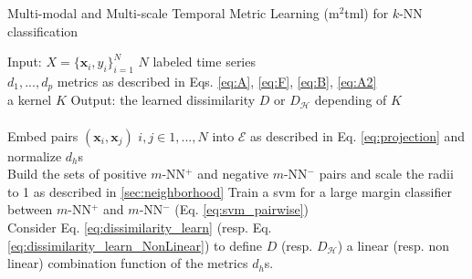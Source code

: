 \begin{algorithm}[h!]
	\begin{algorithmic}[1]
		\caption{Multi-modal and Multi-scale Temporal Metric Learning ({\sc m}$^2${\sc tml}) for $k$-NN classification}
		\label{algo:MMTML}
		\STATE Input:  
		$X=\{\textbf{x}_i, y_i\}_{i=1}^N$ $N$ labeled time series \\ \hspace{1.1cm} $d_1, ...,d_p$  metrics as described in Eqs. \ref{eq:A}, \ref{eq:F}, \ref{eq:B}, \ref{eq:A2} \\
		\hspace{1.1cm} a kernel $K$
		\STATE Output:  the learned dissimilarity $D$ or $D_{\mathcal{H}}$ depending of $K$ \\
		 \\   
		Embed pairs $(\textbf{x}_i,\textbf{x}_j)$ $i,j \in {1,...,N}$ into $\mathcal{E}$ as described in Eq. \ref{eq:projection} and normalize $d_h$s
		 \\   
		Build the sets of positive $m$-NN$^+$ and negative $m$-NN$^-$ pairs and scale the radii to 1 as described in \ref{sec:neighborhood}
		\STATE Train a {\sc svm}  for a large margin classifier between  $m$-NN$^+$  and $m$-NN$^-$ (Eq. \ref{eq:svm_pairwise})
		 \\ 
		Consider Eq. \ref{eq:dissimilarity_learn} (resp. Eq. \ref{eq:dissimilarity_learn_NonLinear}) to define $D$ (resp. $D_{\mathcal{H}}$) a linear (resp. non linear) combination function of the metrics $d_h$s.
	\end{algorithmic}
\end{algorithm}


